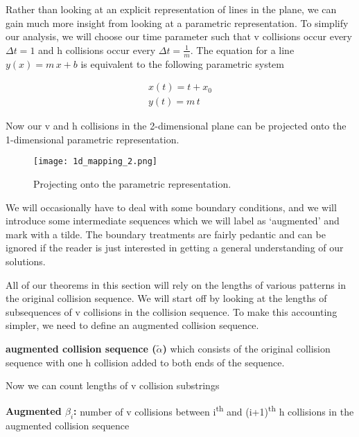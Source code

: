 
Rather than looking at an explicit representation of lines in the plane, we can gain much more insight from looking at a parametric representation. To simplify our analysis, we will choose our time parameter such that v collisions occur every $\Delta t = 1$ and h collisions occur every $\Delta t = \frac{1}{m}$. The equation for a line $y(x) = m \, x + b$ is equivalent to the following parametric system

\begin{align}\label{eq:parametric-line}
	x(t) = t + x_0\\
	y(t) = m \, t
\end{align}

Now our v and h collisions in the 2-dimensional plane can be projected onto the 1-dimensional parametric representation.

\begin{figure}[H]
  \begin{center}
    \texttt{[image: 1d\_mapping\_2.png]}
  \end{center}
  \vspace{-.2in} %
  \caption{\label{fig:1d-projection} Projecting onto the parametric representation.}
\end{figure}

We will occasionally have to deal with some boundary conditions, and we will introduce some intermediate sequences which we will label as `augmented' and mark with a tilde. The boundary treatments are fairly pedantic and can be ignored if the reader is just interested in getting a general understanding of our solutions.

All of our theorems in this section will rely on the lengths of various patterns in the original collision sequence. We will start off by looking at the lengths of subsequences of v collisions in the collision sequence. To make this accounting simpler, we need to define an augmented collision sequence.

\begin{definition}
	\textbf{augmented collision sequence ($\tilde{\alpha}$)} which consists of the original collision sequence with one h collision added to both ends of the sequence.
\end{definition}

Now we can count lengths of v collision substrings

\begin{definition}
	\textbf{Augmented $\beta_i$:} number of v collisions between i\textsuperscript{th} and (i+1)\textsuperscript{th} h collisions in the augmented collision sequence
\end{definition}

